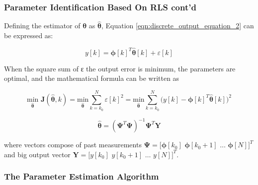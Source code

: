 \documentclass{beamer}
\begin{document}
\begin{frame}
	
	\frametitle{Parameter Identification Based On RLS cont'd}
	
	Defining the estimator of $\bm{\theta}$ as $\bm{\hat{\theta}}$, Equation \ref{eqn:discrete_output_equation_2} can be expressed as:
	
	\begin{equation}
		\label{eqn:discrete_output_equation_3}
		y[k] = \bm{\phi}[k]^{T}\bm{\hat{\theta}}[k] + \varepsilon[k]
	\end{equation}	
	
	When the square sum of ε the output error is minimum, the parameters are optimal, and the mathematical formula can be written as
	
	\begin{equation}
		\label{eqn:RLS}
		\underset{\bm{\hat{\theta}}}{\text{min}}
		\,\,\bm{{J}}(\bm{\hat{\theta}},k) = \underset{\bm{\hat{\theta}}}{\text{min}} \sum_{k=k_{0}}^{N}\varepsilon[k]^{2} = \underset{\bm{\hat{\theta}}}{\text{min}} \sum_{k=k_{0}}^{N}\bigg(y[k] - \bm{\phi}[k]^{T}\bm{\hat{\theta}}[k]\bigg)^{2}
	\end{equation}
	
	\begin{equation}
		\label{eqn:Least_square_one_step_solution}
		\bm{\hat{\theta}} = (\bm{\Psi}^{T}\bm{\Psi})^{-1}\bm{\Psi}^{T}\bm{Y}
	\end{equation}

	where vectors compose of past measurements $\bm{\Psi}= \big[\bm{\phi}[k_{0}]\,\,\bm{\phi}[k_{0}+1]\,\,\dots\,\,\bm{\phi}[N]\big]^{T}$ and big output vector $\bm{Y}=\big[y[k_{0}]\,\,y[k_{0}+1]\,\,\dots\,\,y[N]\big]^{T}$.
	
\end{frame}

\subsubsection{The Parameter Estimation Algorithm}
\end{document}
